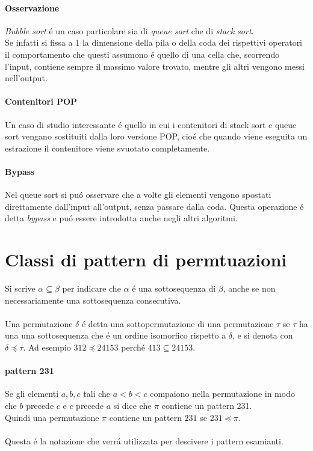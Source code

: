 \paragraph*{Osservazione}\textit{Bubble sort} \'e un caso particolare sia di \textit{queue sort} che di \textit{stack sort}.\\
Se infatti si fissa a 1 la dimensione della pila o della coda dei rispettivi operatori il comportamento che questi assumono \'e quello di una cella che, scorrendo l'input, contiene sempre il massimo valore trovato, mentre gli altri vengono messi nell'output.
\paragraph*{Contenitori POP}Un caso di studio interessante \'e quello in cui i contenitori di stack sort e queue sort vengano sostituiti dalla loro versione POP, cio\'e che quando viene eseguita un estrazione il contenitore viene svuotato completamente. 
\paragraph*{Bypass}Nel queue sort si pu\'o osservare che a volte gli elementi vengono spostati direttamente dall'input all'output, senza passare dalla coda. Questa operazione \'e detta \textit{bypass} e pu\'o essere introdotta anche negli altri algoritmi.
\section*{Classi di pattern di permtuazioni}
\cite{bouvel2022preimages}
Si scrive $\alpha \subseteq \beta$ per indicare che $\alpha$ \'e una sottosequenza di $\beta$, anche se non necessariamente una sottosequenza consecutiva.\\\\
Una permutazione $\delta$ \'e detta una sottopermutazione di una permutazione $\tau$ se $\tau$ ha una una sottosequenza che \'e un ordine isomorfico rispetto a $\delta$, e si denota con $\delta\preceq\tau$. Ad esempio $312 \preceq 24153$ perch\'e $413 \subseteq 24153$.
\paragraph*{pattern 231}Se gli elementi ${a,b,c}$ tali che $a<b<c$ compaiono nella permutazione in modo che $b$ precede $c$ e $c$ precede $a$ si dice che $\pi$ contiene un pattern 231.\\
Quindi una permutazione $\pi$ contiene un pattern $231$ se $231\preceq\pi$.\\\\
Questa \'e la notazione che verr\'a utilizzata per descivere i pattern esamianti.

